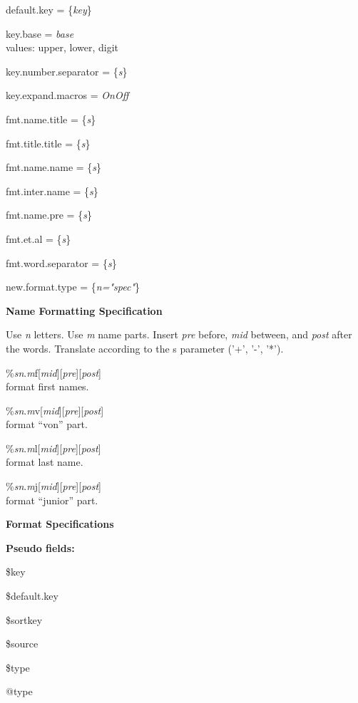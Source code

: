 \documentclass[a4paper]{article}
\newenvironment{FlatList}{\begin{list}{}{%
      \topsep=0pt\itemsep=0pt\parsep=0pt\let\makelabel=\flatlistlabel}}{\end{list}}%
\newcommand\flatlistlabel[1]{\descriptionlabel{\textsf{#1}}}
\newcommand\Arg[1]{\textrm{\{}\textsl{#1}\textrm{\}}}
\newcommand\ARG[1]{\textsl{#1}}
\newcommand\OnOff{\textsl{OnOff}}
\newcommand\Section[1]{\begin{center}\normalsize\bfseries
    #1\end{center}\nobreak }
\begin{document}
\begin{multicols}{4}
\begin{FlatList}
  \item [default.key		= \Arg{key}]
  \item [key.base		= \ARG{base}]\ \\
    values: upper, lower, digit
  \item [key.number.separator	= \Arg{s}]
  \item [key.expand.macros	= \OnOff]
  \item [fmt.name.title		= \Arg{s}]
  \item [fmt.title.title	= \Arg{s}]
  \item [fmt.name.name		= \Arg{s}]
  \item [fmt.inter.name		= \Arg{s}]
  \item [fmt.name.pre		= \Arg{s}]
  \item [fmt.et.al		= \Arg{s}]
  \item [fmt.word.separator	= \Arg{s}]
  \item [new.format.type	= \Arg{n="spec"}]
  \end{FlatList}
  \Section{Name Formatting Specification}
    Use {\it n}\/ letters. Use {\it m} name parts.  Insert {\it pre}\/
    before, {\it mid} between, and {\it post} after the words.
    Translate according to the s parameter ('+', '-', '*').
  \begin{FlatList}
  \item [\%{\it s}{\it n}.{\it m}\/f{[{\it mid}][{\it pre}][{\it post}]}]\ \\
    format first names. 
  \item [\%{\it s}{\it n}.{\it m}\/v{[{\it mid}][{\it pre}][{\it post}]}]\ \\
    format ``von'' part.
  \item [\%{\it s}{\it n}.{\it m}\/l{[{\it mid}][{\it pre}][{\it post}]}]\ \\
    format last name.
  \item [\%{\it s}{\it n}.{\it m}\/j{[{\it mid}][{\it pre}][{\it post}]}]\ \\
    format ``junior'' part.
  \end{FlatList}
  \Section{Format Specifications}
  \textbf{Pseudo fields:} 
  \begin{FlatList}
  \item [\$key]
  \item [\$default.key]
  \item [\$sortkey]
  \item [\$source]
  \item [\$type]
  \item [@type]

\end{FlatList}
\end{multicols}
\end{document}

